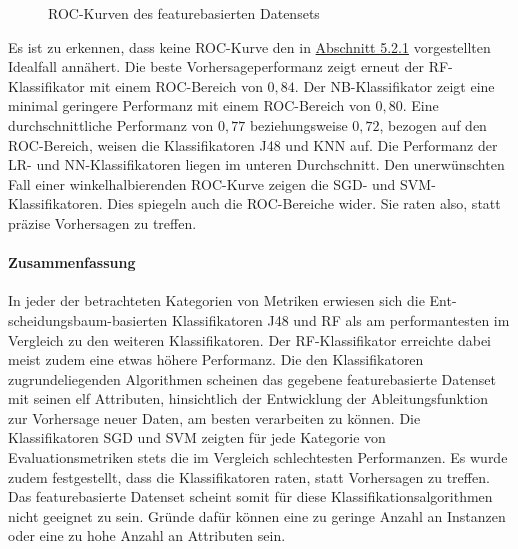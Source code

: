 \begin{figure}[h!t]
  \caption{ROC-Kurven des featurebasierten Datensets \label{fig:roc-feat}}
\end{figure}

Es ist zu erkennen, dass keine ROC-Kurve den in \hyperref[roc-def]{Abschnitt 5.2.1} vorgestellten Idealfall annähert. Die beste Vorhersageperformanz zeigt erneut der RF-Klassifikator mit einem ROC-Bereich von $0,84$. Der NB-Klassifikator zeigt eine minimal geringere Performanz mit einem ROC-Bereich von $0,80$. Eine durchschnittliche Performanz von $0,77$ beziehungsweise $0,72$, bezogen auf den ROC-Bereich, weisen die Klassifikatoren J48 und KNN auf. Die Performanz der LR- und NN-Klassifikatoren liegen im unteren Durchschnitt. Den unerwünschten Fall einer winkelhalbierenden ROC-Kurve zeigen die SGD- und SVM-Klassifikatoren. Dies spiegeln auch die ROC-Bereiche wider. Sie \glqq raten\grqq{} also, statt präzise Vorhersagen zu treffen.

\paragraph{Zusammenfassung}
In jeder der betrachteten Kategorien von Metriken erwiesen sich die Ent-scheidungsbaum-basierten Klassifikatoren J48 und RF als am performantesten im Vergleich zu den weiteren Klassifikatoren. Der RF-Klassifikator erreichte dabei meist zudem eine etwas höhere Performanz. Die den Klassifikatoren zugrundeliegenden Algorithmen scheinen das gegebene featurebasierte Datenset mit seinen elf Attributen, hinsichtlich der Entwicklung der Ableitungsfunktion zur Vorhersage neuer Daten, am besten verarbeiten zu können.
Die Klassifikatoren SGD und SVM zeigten für jede Kategorie von Evaluationsmetriken stets die im Vergleich schlechtesten Performanzen. Es wurde zudem festgestellt, dass die Klassifikatoren raten, statt Vorhersagen zu treffen. Das featurebasierte Datenset scheint somit für diese Klassifikationsalgorithmen nicht geeignet zu sein. Gründe dafür können eine zu geringe Anzahl an Instanzen oder eine zu hohe Anzahl an Attributen sein.

